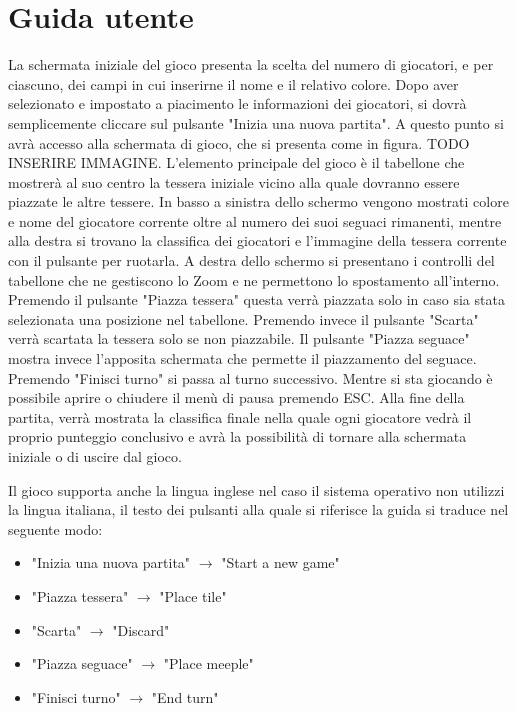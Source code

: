 \section{Guida utente}

La schermata iniziale del gioco presenta la scelta del numero di giocatori, e per ciascuno, dei campi in cui inserirne il nome e il relativo colore. Dopo aver selezionato e impostato a piacimento le informazioni dei giocatori, si dovrà semplicemente cliccare sul pulsante "Inizia una nuova partita". A questo punto si avrà accesso alla schermata di gioco, che si presenta come in figura. TODO INSERIRE IMMAGINE. L'elemento principale del gioco è il tabellone che mostrerà al suo centro la tessera iniziale vicino alla quale dovranno essere piazzate le altre tessere. In basso a sinistra dello schermo vengono mostrati colore e nome del giocatore corrente oltre al numero dei suoi seguaci rimanenti, mentre alla destra si trovano la classifica dei giocatori e l'immagine della tessera corrente con il pulsante per ruotarla. A destra dello schermo si presentano i controlli del tabellone che ne gestiscono lo Zoom e ne permettono lo spostamento all'interno. Premendo il pulsante "Piazza tessera" questa verrà piazzata solo in caso sia stata selezionata una posizione nel tabellone. Premendo invece il pulsante "Scarta" verrà scartata la tessera solo se non piazzabile. Il pulsante "Piazza seguace" mostra invece l'apposita schermata che permette il piazzamento del seguace. Premendo "Finisci turno" si passa al turno successivo. Mentre si sta giocando è possibile aprire o chiudere il menù di pausa premendo ESC. Alla fine della partita, verrà mostrata la classifica finale nella quale ogni giocatore vedrà il proprio punteggio conclusivo e avrà la possibilità di tornare alla schermata iniziale o di uscire dal gioco.

Il gioco supporta anche la lingua inglese nel caso il sistema operativo non utilizzi la lingua italiana, il testo dei pulsanti alla quale si riferisce la guida si traduce nel seguente modo:
\begin{itemize}
    \item "Inizia una nuova partita" $\rightarrow$ "Start a new game"
    \item "Piazza tessera" $\rightarrow$ "Place tile"
    \item "Scarta" $\rightarrow$ "Discard"
    \item "Piazza seguace" $\rightarrow$ "Place meeple"
    \item "Finisci turno" $\rightarrow$ "End turn"
\end{itemize}
